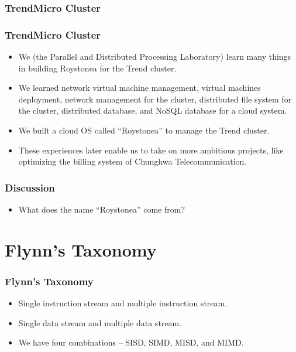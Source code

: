 \documentclass{beamer}
\begin{document}
\begin{CJK}{UTF8}{bsmi}
\begin{frame}
\frametitle{TrendMicro Cluster}
\centerline{}
\end{frame}

\begin{frame}
\frametitle{TrendMicro Cluster}
\centerline{}
\end{frame}

\begin{frame}
\begin{itemize}
\item We (the Parallel and Distributed Processing Laboratory) learn
  many things in building Roystonea for the Trend cluster.
\item We learned network virtual machine management, virtual machines deployment, network management for the cluster, distributed file system for the cluster, distributed database, and NoSQL database for a cloud system.
\item We built a cloud OS called ``Roystonea'' to manage the Trend cluster.
\item These experiences later enable us to take on more ambitious projects, like optimizing the billing system of Chunghwa Telecommunication.
\end{itemize}
\end{frame}


\begin{frame}
\frametitle{Discussion}
\begin{itemize}
\item What does the name ``Roystonea'' come from?
\end{itemize}
\end{frame}

\section{Flynn's Taxonomy}

\begin{frame}
\frametitle{Flynn's Taxonomy}
\begin{itemize}
\item Single instruction stream and multiple instruction stream.
\item Single data stream and multiple data stream.
\item We have four combinations -- SISD, SIMD, MISD, and MIMD.
\end{itemize}
\end{frame}


\end{CJK}
\end{document}
